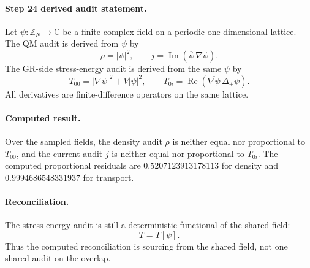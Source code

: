 \paragraph{Step 24 derived audit statement.}
Let \(\psi:\mathbb Z_N\to\mathbb C\) be a finite complex field on a
periodic one-dimensional lattice.  The QM audit is derived from
\(\psi\) by
\[
  \rho=|\psi|^2,\qquad
  j=\operatorname{Im}(\overline\psi\,\nabla\psi).
\]
The GR-side stress-energy audit is derived from the same \(\psi\) by
\[
  T_{00}=|\nabla\psi|^2+V|\psi|^2,\qquad
  T_{0i}=\operatorname{Re}(\overline{\nabla\psi}\,\Delta_+\psi).
\]
All derivatives are finite-difference operators on the same lattice.

\paragraph{Computed result.}
Over the sampled fields, the density audit \(\rho\) is neither equal
nor proportional to \(T_{00}\), and the current audit \(j\) is neither
equal nor proportional to \(T_{0i}\).  The computed proportional
residuals are \(0.5207123913178113\) for density and
\(0.9994686548331937\) for transport.

\paragraph{Reconciliation.}
The stress-energy audit is still a deterministic functional of the
shared field:
\[
  T=T[\psi].
\]
Thus the computed reconciliation is sourcing from the shared field,
not one shared audit on the overlap.
